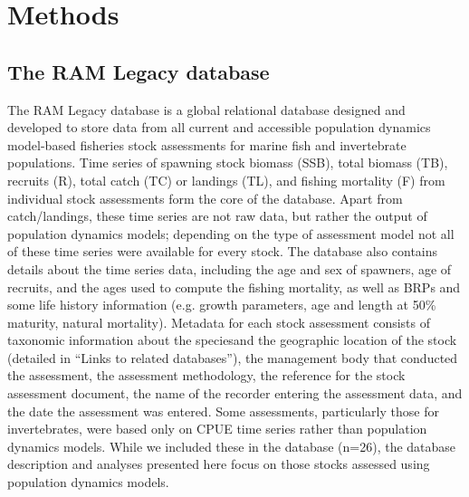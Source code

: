 \documentclass[letterpaper,review,authoryear,12pt]{elsarticle}
\begin{document}

\newpage
\section*{Methods} 

\subsection*{The RAM Legacy database}
The RAM Legacy database is a global relational database designed and
developed to store data from all current and accessible population
dynamics model-based fisheries stock assessments for marine fish and
invertebrate populations. Time series of spawning stock biomass (SSB),
total biomass (TB), recruits (R), total catch (TC) or landings (TL),
and fishing mortality (F) from individual stock assessments form the
core of the database.  Apart from catch/landings, these time series
are not raw data, but rather the output of population dynamics models;
depending on the type of assessment model not all of these time series
were available for every stock. The database also contains details
about the time series data, including the age and sex of spawners, age
of recruits, and the ages used to compute the fishing mortality, as
well as BRPs and some life history information (e.g. growth
parameters, age and length at 50\% maturity, natural mortality).
Metadata for each stock assessment consists of taxonomic information
about the speciesand the geographic location of the stock (detailed in
``Links to related databases''), the management body that conducted
the assessment, the assessment methodology, the reference for the
stock assessment document, the name of the recorder entering the
assessment data, and the date the assessment was entered.  Some
assessments, particularly those for invertebrates, were based only on
CPUE time series rather than population dynamics models. While we
included these in the database (n=26), the database description and
analyses presented here focus on those stocks assessed using
population dynamics models.
\end{document}
